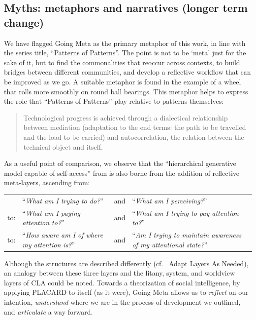 \documentclass[acmlarge,timestamp]{acmart}
\begin{document}
\subsection{Myths: metaphors and narratives (longer term change)}
We have flagged {\sc Going Meta} as the primary metaphor of this work,
in line with the series title, “Patterns of Patterns”.  The point is
not to be ‘meta’ just for the sake of it, but to find the
commonalities that reoccur across contexts, to build bridges between
different communities, and develop a reflective workflow that can be
improved as we go.  A suitable metaphor is found in the example of a
wheel that rolls more smoothly on round ball bearings.  This metaphor
helps to express the role that “Patterns of Patterns” play relative to
patterns themselves:
\begin{quote}
Technological progress is achieved through a dialectical relationship
between mediation (adaptation to the end terms: the path to be
travelled and the load to be carried) and autocorrelation, the
relation between the technical object and
itself. \cite{Simondon2005-pq}
\end{quote}
As a useful point of comparison, we observe that the “hierarchical
generative model capable of self-access” from
\citet{albarracin2023designing} is also borne from the addition of
reflective meta-layers, ascending from:

{
\renewcommand*{\arraystretch}{1.2}
\begin{tabular}{lllp{}}
  &``\emph{What am I trying to do?}''&and&``\emph{What am I perceiving?}''\\
to:&``\emph{What am I paying attention to?}''&and&``\emph{What am I trying to pay attention to?}''\\
to:&``\emph{How aware am I of where my attention is?}''&and&``\emph{Am I trying to maintain awareness of my \phantom{X} attentional state?}''
\end{tabular}
}

\medskip
\noindent Although the structures are described differently (cf.~{\sc
  Adapt Layers As Needed}), an analogy between these three layers and
the litany, system, and worldview layers of CLA could be noted.
Towards a theorization of social intelligence, by applying PLACARD to
itself (as it were), {\sc Going Meta} allows us to \emph{reflect} on
our intention, \emph{understand} where we are in the process of
development we outlined, and \emph{articulate} a way forward.


\renewcommand\bibname{References}
\renewcommand\refname{References}
\end{document}

